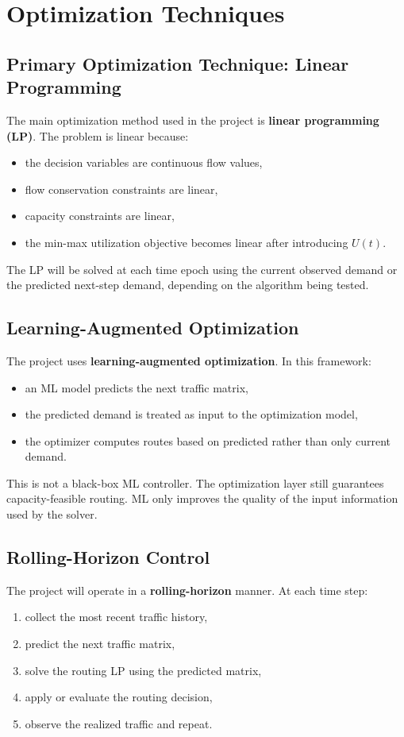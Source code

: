 \documentclass[11pt]{article}
\begin{document}
\section{Optimization Techniques}
\subsection{Primary Optimization Technique: Linear Programming}
The main optimization method used in the project is \textbf{linear programming (LP)}. The problem is linear because:
\begin{itemize}
    \item the decision variables are continuous flow values,
    \item flow conservation constraints are linear,
    \item capacity constraints are linear,
    \item the min-max utilization objective becomes linear after introducing $U(t)$.
\end{itemize}

The LP will be solved at each time epoch using the current observed demand or the predicted next-step demand, depending on the algorithm being tested.

\subsection{Learning-Augmented Optimization}
The project uses \textbf{learning-augmented optimization}. In this framework:
\begin{itemize}
    \item an ML model predicts the next traffic matrix,
    \item the predicted demand is treated as input to the optimization model,
    \item the optimizer computes routes based on predicted rather than only current demand.
\end{itemize}

This is not a black-box ML controller. The optimization layer still guarantees capacity-feasible routing. ML only improves the quality of the input information used by the solver.

\subsection{Rolling-Horizon Control}
The project will operate in a \textbf{rolling-horizon} manner. At each time step:
\begin{enumerate}
    \item collect the most recent traffic history,
    \item predict the next traffic matrix,
    \item solve the routing LP using the predicted matrix,
    \item apply or evaluate the routing decision,
    \item observe the realized traffic and repeat.
\end{enumerate}
\end{document}
